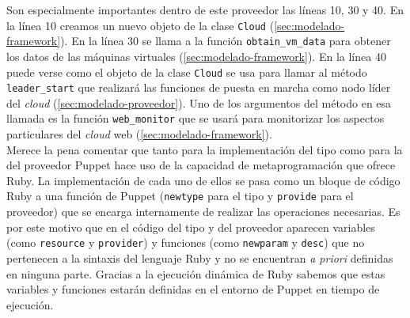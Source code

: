 Son especialmente importantes dentro de este proveedor las líneas 10, 30 y 40. En la línea 10 creamos un nuevo objeto de la clase \texttt{Cloud} (\ref{sec:modelado-framework}). En la línea 30 se llama a la función \texttt{obtain\_vm\_data} para obtener los datos de las máquinas virtuales (\ref{sec:modelado-framework}). En la línea 40 puede verse como el objeto de la clase \texttt{Cloud} se usa para llamar al método \texttt{leader\_start} que realizará las funciones de puesta en marcha como nodo líder del \emph{cloud} (\ref{sec:modelado-proveedor}). Uno de los argumentos del método en esa llamada es la función \texttt{web\_monitor} que se usará para monitorizar los aspectos particulares del \emph{cloud} web (\ref{sec:modelado-framework}). \\

Merece la pena comentar que tanto para la implementación del tipo como para la del proveedor Puppet hace uso de la capacidad de metaprogramación que ofrece Ruby. La implementación de cada uno de ellos se pasa como un bloque de código Ruby a una función de Puppet (\texttt{newtype} para el tipo y \texttt{provide} para el proveedor) que se encarga internamente de realizar las operaciones necesarias. Es por este motivo que en el código del tipo y del proveedor aparecen variables (como \texttt{resource} y \texttt{provider}) y funciones (como \texttt{newparam} y \texttt{desc}) que no pertenecen a la sintaxis del lenguaje Ruby y no se encuentran \emph{a priori} definidas en ninguna parte. Gracias a la ejecución dinámica de Ruby sabemos que estas variables y funciones estarán definidas en el entorno de Puppet en tiempo de ejecución.


